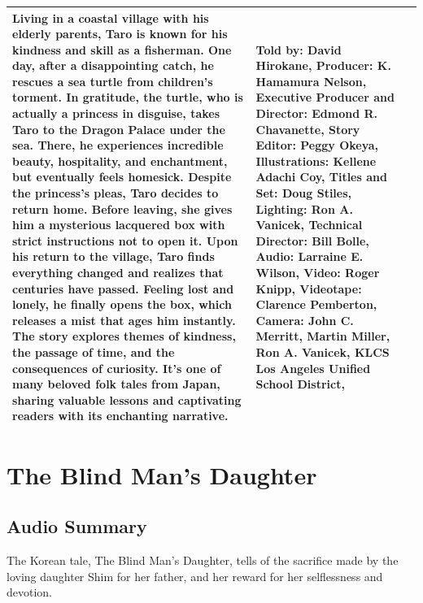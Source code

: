 \begin{table}[h]
\begin{small}
\begin{tabular}{|p{1.5cm}|p{8.5cm}|p{7cm}|}
            Living in a coastal village with his elderly parents, Taro is known for his kindness and skill as a fisherman.
            One day, after a disappointing catch, he rescues a sea turtle from children's torment.
            In gratitude, the turtle, who is actually a princess in disguise, takes Taro to the Dragon Palace under the sea.
            There, he experiences incredible beauty, hospitality, and enchantment, but eventually feels homesick.
            Despite the princess's pleas, Taro decides to return home. Before leaving, she gives him a mysterious lacquered box with strict instructions not to open it.
            Upon his return to the village, Taro finds everything changed and realizes that centuries have passed.
            Feeling lost and lonely, he finally opens the box, which releases a mist that ages him instantly.
            The story explores themes of kindness, the passage of time, and the consequences of curiosity.
            It's one of many beloved folk tales from Japan, sharing valuable lessons and captivating readers with its enchanting narrative.
                                 &
            Told by: David Hirokane,
            Producer: K. Hamamura Nelson,
            Executive Producer and Director: Edmond R. Chavanette,
            Story Editor: Peggy Okeya,
            Illustrations: Kellene Adachi Coy,
            Titles and Set: Doug Stiles,
            Lighting: Ron A. Vanicek,
            Technical Director: Bill Bolle,
            Audio: Larraine E. Wilson,
            Video: Roger Knipp,
            Videotape: Clarence Pemberton,
            Camera: John C. Merritt, Martin Miller, Ron A. Vanicek,
            KLCS Los Angeles Unified School District,
            \\
            \hline
        \end{tabular}
    \end{small}

\end{table}

\clearpage
\newpage

\section{The Blind Man's Daughter}

\subsection{Audio Summary}

The Korean tale, The Blind Man's Daughter, tells of the sacrifice made by the loving daughter Shim for her father, and her reward for her selflessness and devotion.

